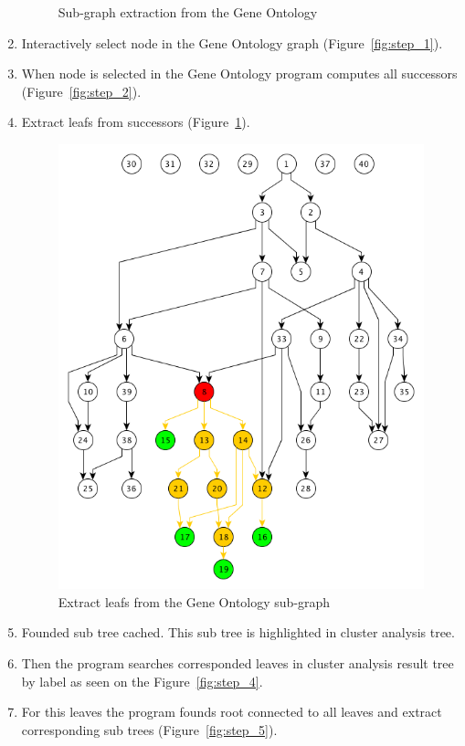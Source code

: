 \begin{enumerate}
\begin{figure}[h!]
{}
\caption{Sub-graph extraction from the Gene Ontology}
\end{figure}

\item Interactively select node in the Gene Ontology graph (Figure~\ref{fig:step_1}).

\item When node is selected in the Gene Ontology program computes all successors (Figure~\ref{fig:step_2}).

\item Extract leafs from successors (Figure~\ref{fig:step_3}).

\begin{figure}[h!]
\centering
\includegraphics[scale=0.5]{pictures/subgraph_extraction_algorithm_step_3.png}
\caption{Extract leafs from the Gene Ontology sub-graph}
\label{fig:step_3}
\end{figure}

\item Founded sub tree cached. This sub tree is highlighted in cluster analysis tree.

\item Then the program searches corresponded leaves in cluster analysis result tree by label as seen on the Figure~\ref{fig:step_4}.

\item For this leaves the program founds root connected to all leaves and extract corresponding sub trees (Figure~\ref{fig:step_5}).
\end{enumerate}


